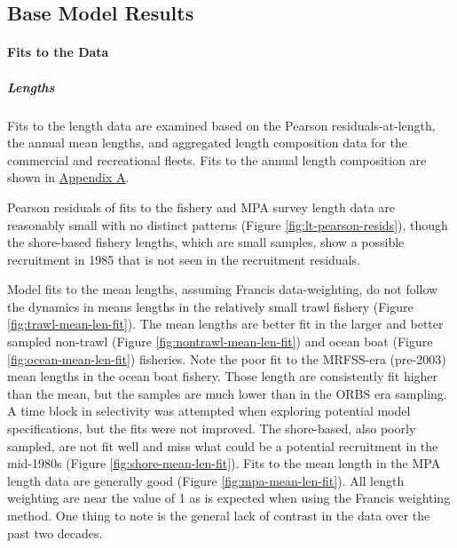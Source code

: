 \documentclass[11pt,
  english,
  letterpaper,
]{article}
\begin{document}
\hypertarget{base-model-results}{%
\subsection{Base Model Results}\label{base-model-results}}

\hypertarget{fits-to-the-data}{%
\paragraph{Fits to the Data}\label{fits-to-the-data}}

\hypertarget{lengths}{%
\subparagraph{Lengths}\label{lengths}}

Fits to the length data are examined based on the Pearson residuals-at-length, the annual mean lengths, and aggregated length composition data for the commercial and recreational fleets. Fits to the annual length composition are shown in \protect\hyperlink{app_a}{Appendix A}.

Pearson residuals of fits to the fishery and MPA survey length data are reasonably small with no distinct patterns (Figure \ref{fig:lt-pearson-resids}), though the shore-based fishery lengths, which are small samples, show a possible recruitment in 1985 that is not seen in the recruitment residuals.

Model fits to the mean lengths, assuming Francis data-weighting, do not follow the dynamics in means lengths in the relatively small trawl fishery (Figure \ref{fig:trawl-mean-len-fit}). The mean lengths are better fit in the larger and better sampled non-trawl (Figure \ref{fig:nontrawl-mean-len-fit}) and ocean boat (Figure \ref{fig:ocean-mean-len-fit}) fisheries. Note the poor fit to the MRFSS-era (pre-2003) mean lengths in the ocean boat fishery. Those length are consistently fit higher than the mean, but the samples are much lower than in the ORBS era sampling. A time block in selectivity was attempted when exploring potential model specifications, but the fits were not improved. The shore-based, also poorly sampled, are not fit well and miss what could be a potential recruitment in the mid-1980s (Figure \ref{fig:shore-mean-len-fit}). Fits to the mean length in the MPA length data are generally good (Figure \ref{fig:mpa-mean-len-fit}). All length weighting are near the value of 1 as is expected when using the Francis weighting method. One thing to note is the general lack of contrast in the data over the past two decades.
\end{document}
